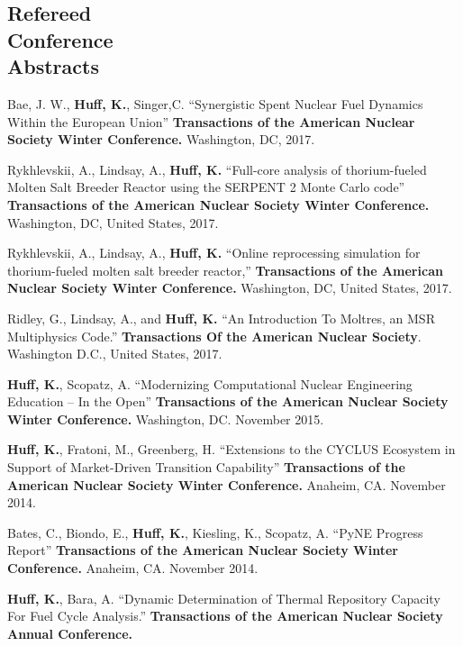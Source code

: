\documentclass[margin,line]{resume}
\begin{document}
\begin{resume}
    \section{\mysidestyle Refereed\\Conference\\Abstracts}
    \begin{bibenum}
    \item Bae, J. W., \textbf{Huff, K.}, Singer,C. ``Synergistic Spent Nuclear Fuel Dynamics Within the European Union'' 
            \textbf{Transactions of the American Nuclear Society Winter Conference.} 
            Washington, DC, 2017.  
    \item Rykhlevskii, A., Lindsay, A., \textbf{Huff, K.} ``Full-core analysis of thorium-fueled Molten Salt Breeder Reactor using the SERPENT 2 Monte Carlo code'' 
            \textbf{Transactions of the American Nuclear Society Winter Conference.} 
            Washington, DC, United States, 2017.
    \item Rykhlevskii, A., Lindsay, A., \textbf{Huff, K.} ``Online reprocessing simulation for thorium-fueled molten salt breeder reactor,'' 
            \textbf{Transactions of the American Nuclear Society Winter Conference.} 
            Washington, DC, United States, 2017.
    \item Ridley, G., Lindsay, A., and \textbf{Huff, K.} ``An 
            Introduction To Moltres, an MSR Multiphysics Code.'' \textbf{Transactions 
            Of the American Nuclear Society}. Washington D.C., United States, 
            2017.
      \item \textbf{Huff, K.}, Scopatz, A. ``Modernizing Computational Nuclear Engineering Education -- In the Open''
         \textbf{Transactions of the American Nuclear Society Winter Conference.}
         Washington, DC. November 2015.
      \item \textbf{Huff, K.}, Fratoni, M., Greenberg, H. ``Extensions to the CYCLUS Ecosystem in Support of Market-Driven Transition Capability''
         \textbf{Transactions of the American Nuclear Society Winter Conference.}
         Anaheim, CA. November 2014.
      \item Bates, C., Biondo, E., \textbf{Huff, K.}, Kiesling, K., Scopatz, A. ``PyNE Progress Report''
         \textbf{Transactions of the American Nuclear Society Winter Conference.}
         Anaheim, CA. November 2014.
      \item \textbf{Huff, K.}, Bara, A. ``Dynamic Determination of Thermal Repository Capacity For Fuel Cycle Analysis.''
         \textbf{Transactions of the American Nuclear Society Annual Conference.}

\end{bibenum}
\end{resume}
\end{document}

